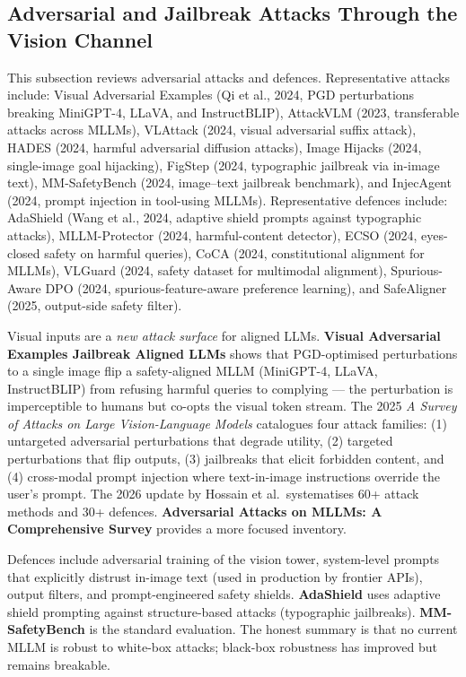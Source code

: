 \documentclass{article}
\begin{document}
\subsection{Adversarial and Jailbreak Attacks Through the Vision Channel}\label{adversarial-and-jailbreak-attacks-through-the-vision-channel}

This subsection reviews adversarial attacks and defences. Representative attacks include: Visual Adversarial Examples (Qi et al., 2024, PGD perturbations breaking MiniGPT-4, LLaVA, and InstructBLIP), AttackVLM (2023, transferable attacks across MLLMs), VLAttack (2024, visual adversarial suffix attack), HADES (2024, harmful adversarial diffusion attacks), Image Hijacks (2024, single-image goal hijacking), FigStep (2024, typographic jailbreak via in-image text), MM-SafetyBench (2024, image--text jailbreak benchmark), and InjecAgent (2024, prompt injection in tool-using MLLMs). Representative defences include: AdaShield (Wang et al., 2024, adaptive shield prompts against typographic attacks), MLLM-Protector (2024, harmful-content detector), ECSO (2024, eyes-closed safety on harmful queries), CoCA (2024, constitutional alignment for MLLMs), VLGuard (2024, safety dataset for multimodal alignment), Spurious-Aware DPO (2024, spurious-feature-aware preference learning), and SafeAligner (2025, output-side safety filter).

Visual inputs are a \emph{new attack surface} for aligned LLMs. \textbf{Visual Adversarial Examples Jailbreak Aligned LLMs} \citep{qi20242024} shows that PGD-optimised perturbations to a single image flip a safety-aligned MLLM (MiniGPT-4, LLaVA, InstructBLIP) from refusing harmful queries to complying --- the perturbation is imperceptible to humans but co-opts the visual token stream. The 2025 \emph{A Survey of Attacks on Large Vision-Language Models} \citep{liu20252025} catalogues four attack families: (1) untargeted adversarial perturbations that degrade utility, (2) targeted perturbations that flip outputs, (3) jailbreaks that elicit forbidden content, and (4) cross-modal prompt injection where text-in-image instructions override the user's prompt. The 2026 update by Hossain et al.~systematises 60+ attack methods and 30+ defences. \textbf{Adversarial Attacks on MLLMs: A Comprehensive Survey} \citep{jain2026adversarialattacks} provides a more focused inventory.

Defences include adversarial training of the vision tower, system-level prompts that explicitly distrust in-image text (used in production by frontier APIs), output filters, and prompt-engineered safety shields. \textbf{AdaShield} \citep{wang20242024} uses adaptive shield prompting against structure-based attacks (typographic jailbreaks). \textbf{MM-SafetyBench} is the standard evaluation. The honest summary is that no current MLLM is robust to white-box attacks; black-box robustness has improved but remains breakable.
\end{document}
